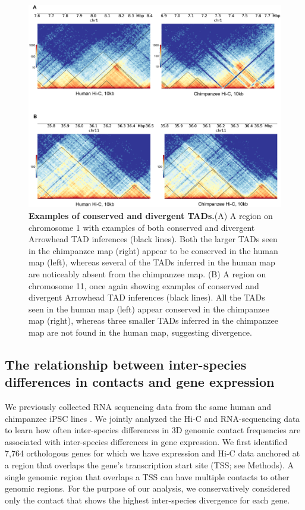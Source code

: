 \begin{figure}
\centering
\includegraphics[width=6in]{img/fig5.PNG}
\caption[Examples of conserved and divergent TADs.]{\textbf{Examples of conserved and divergent TADs.}(A) A region on chromosome 1 with examples of both conserved and divergent Arrowhead \cite{Durand.2016} TAD inferences (black lines). Both the larger TADs seen in the chimpanzee map (right) appear to be conserved in the human map (left), whereas several of the TADs inferred in the human map are noticeably absent from the chimpanzee map. (B) A region on chromosome 11, once again showing examples of conserved and divergent Arrowhead TAD inferences (black lines). All the TADs seen in the human map (left) appear conserved in the chimpanzee map (right), whereas three smaller TADs inferred in the chimpanzee map are not found in the human map, suggesting divergence.}
\label{fig:ch02-fig5}
\end{figure}

\subsection{The relationship between inter-species differences in contacts and gene expression}

We previously collected RNA sequencing data from the same human and chimpanzee iPSC lines \cite{Pavlovic.2018}. We jointly analyzed the Hi-C and RNA-sequencing data to learn how often inter-species differences in 3D genomic contact frequencies are associated with inter-species differences in gene expression. We first identified 7,764 orthologous genes for which we have expression and Hi-C data anchored at a region that overlaps the gene's transcription start site (TSS; see Methods). A single genomic region that overlaps a TSS can have multiple contacts to other genomic regions. For the purpose of our analysis, we conservatively considered only the contact that shows the highest inter-species divergence for each gene.

